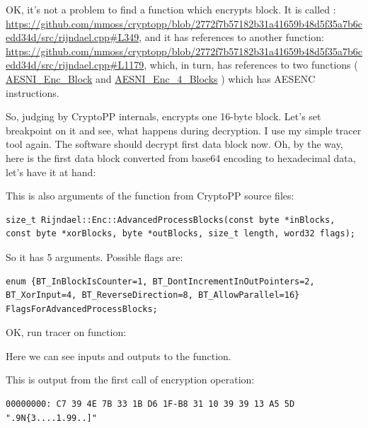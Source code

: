 OK, it's not a problem to find a function which encrypts block.
It is called :
\url{https://github.com/mmoss/cryptopp/blob/2772f7b57182b31a41659b48d5f35a7b6cedd34d/src/rijndael.cpp#L349},
and it has references to another function: 
\url{https://github.com/mmoss/cryptopp/blob/2772f7b57182b31a41659b48d5f35a7b6cedd34d/src/rijndael.cpp#L1179},
which, in turn, has references to two functions (
\href{https://github.com/mmoss/cryptopp/blob/2772f7b57182b31a41659b48d5f35a7b6cedd34d/src/rijndael.cpp#L1000}{AESNI\_Enc\_Block}
and 
\href{https://github.com/mmoss/cryptopp/blob/2772f7b57182b31a41659b48d5f35a7b6cedd34d/src/rijndael.cpp#L1012}{AESNI\_Enc\_4\_Blocks}
)
which has AESENC instructions.

So, judging by CryptoPP internals,  encrypts one 16-byte block.
Let's set breakpoint on it and see, what happens during decryption.
I use my simple tracer tool again.
The software should decrypt first data block now.
Oh, by the way, here is the first data block converted from base64 encoding to hexadecimal data,
let's have it at hand:



This is also arguments of the function from CryptoPP source files:

\begin{lstlisting}
size_t Rijndael::Enc::AdvancedProcessBlocks(const byte *inBlocks, const byte *xorBlocks, byte *outBlocks, size_t length, word32 flags);
\end{lstlisting}

So it has 5 arguments. Possible flags are:

\begin{lstlisting}
enum {BT_InBlockIsCounter=1, BT_DontIncrementInOutPointers=2, BT_XorInput=4, BT_ReverseDirection=8, BT_AllowParallel=16} FlagsForAdvancedProcessBlocks;
\end{lstlisting}

OK, run tracer on  function:



Here we can see inputs and outputs to the  function.

This is output from the first call of encryption operation:

\begin{lstlisting}
00000000: C7 39 4E 7B 33 1B D6 1F-B8 31 10 39 39 13 A5 5D ".9N{3....1.99..]"
\end{lstlisting}

